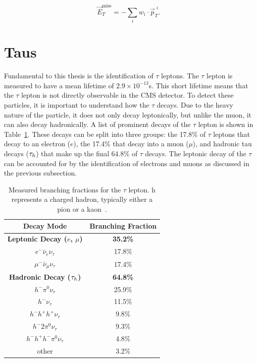 \begin{equation}
\vec{E}_{T}^{\text{miss}} = - \sum_{i} w_{i} \cdot \vec{p}_{T}^{\hspace{4pt}i}.
\end{equation}

\section{Taus}
\label{sec:taus}

Fundamental to this thesis is the identification of $\tau$ leptons.
The $\tau$ lepton is measured to have a mean lifetime of \(2.9 \times 10^{-13}\)s. 
This short lifetime means that the $\tau$ lepton is not directly observable in the \ac{CMS} detector.  
To detect these particles, it is important to understand how the $\tau$ decays. 
Due to the heavy nature of the particle, it does not only decay leptonically, but unlike the muon, it can also decay hadronically.
A list of prominent decays of the $\tau$ lepton is shown in Table~\ref{tab:tau_decay}.
These decays can be split into three groups: the 17.8\% of $\tau$ leptons that decay to an electron ($e$), the 17.4\% that decay into a muon ($\mu$), and hadronic tau decays ($\tau_{h}$) that make up the final 64.8\% of $\tau$ decays. 
The leptonic decay of the $\tau$ can be accounted for by the identification of electrons and muons as discussed in the previous subsection.  \\

\begin{table}[h]
    \centering
    \begin{tabular}{|c|c|}
         \hline
         Decay Mode & Branching Fraction  \\
         \hline
         \hline
         \textbf{Leptonic Decay ($e$, $\mu$)} & \textbf{35.2\%} \\
         $e^- \bar{\nu}_e \nu_\tau $ & 17.8\% \\
         $\mu^- \bar{\nu}_\mu \nu_\tau $ & 17.4\% \\
         \hline
         \textbf{Hadronic Decay ($\tau_{h}$)} & \textbf{64.8\%} \\
         $h^- \pi^0 \nu_\tau $ & 25.9\% \\
         $h^- \nu_\tau$ & 11.5\% \\
         $h^- h^+ h^+ \nu_\tau$ & 9.8\% \\
         $h^- 2\pi^0 \nu_\tau$ & 9.3\% \\
         $h^- h^+ h^- \pi^0 \nu_\tau$ & 4.8\% \\
         other & 3.2\% \\
         \hline
    \end{tabular}
    \caption[Branching fractions of the $\tau$ lepton.]{Measured branching fractions for the $\tau$ lepton. h represents a charged hadron, typically either a pion or a kaon~\cite{ParticleDataGroup:2022pth}.}
    \label{tab:tau_decay}
\end{table}

